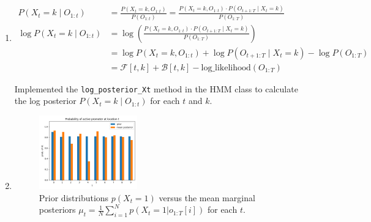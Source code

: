 \documentclass[a4 paper]{article}
\begin{document}
\begin{enumerate}
    \item {}
    
    \begin{align*}
        P(X_t = k \mid O_{1:t}) &= \frac{P(X_t = k, O_{1:t})}{P(O_{1:t})} = \frac{P(X_t = k, O_{1:t}) \cdot P(O_{t+1:T} \mid X_t = k)}{P(O_{1:T})} \\
        \log P(X_t = k \mid O_{1:t}) &= \log \left( \frac{P(X_t = k, O_{1:t}) \cdot P(O_{t+1:T} \mid X_t = k)}{P(O_{1:T})} \right) \\
        &= \log P(X_t = k, O_{1:t}) + \log P(O_{t+1:T} \mid X_t = k) - \log P(O_{1:T}) \\
        &= \mathcal{F}[t, k] + \mathcal{B}[t, k] - \text{log\_likelihood}(O_{1:T})
    \end{align*}

    Implemented the \texttt{log\_posterior\_Xt} method in the HMM class to calculate the log posterior $P(X_t = k \mid O_{1:t})$ for each $t$ and $k$.


    
    \item {}

    \begin{figure}[H]
        \centering
        \includegraphics[width=0.4\textwidth]{../plots/q1_prior_vs_mean_posterior.png}
        \caption{Prior distributions $p(X_t = 1)$ versus the mean marginal posteriors $\mu_t = \frac{1}{N} \sum_{i=1}^{N} p(X_t = 1 | o_{1:T}[i])$ for each $t$.}
    \end{figure}


\end{enumerate}
\end{document}
